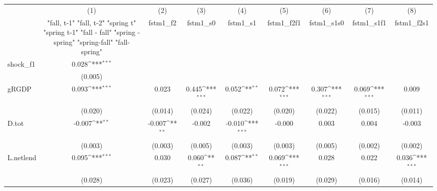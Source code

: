 {
\def\sym#1{\ifmmode^{#1}\else\(^{#1}\)\fi}
\begin{tabular}{l*{8}{c}}
\toprule
            &\multicolumn{1}{c}{(1)}&\multicolumn{1}{c}{(2)}&\multicolumn{1}{c}{(3)}&\multicolumn{1}{c}{(4)}&\multicolumn{1}{c}{(5)}&\multicolumn{1}{c}{(6)}&\multicolumn{1}{c}{(7)}&\multicolumn{1}{c}{(8)}\\
            &\multicolumn{1}{c}{  "fall, t-1" "fall, t-2" "spring t" "spring t-1"  "fall - fall" "spring - spring" "spring-fall" "fall-spring" }&\multicolumn{1}{c}{fstm1\_f2}&\multicolumn{1}{c}{fstm1\_s0}&\multicolumn{1}{c}{fstm1\_s1}&\multicolumn{1}{c}{fstm1\_f2f1}&\multicolumn{1}{c}{fstm1\_s1s0}&\multicolumn{1}{c}{fstm1\_s1f1}&\multicolumn{1}{c}{fstm1\_f2s1}\\
\midrule
shock\_f1    &       0.028\sym{***}&                     &                     &                     &                     &                     &                     &                     \\
            &     (0.005)         &                     &                     &                     &                     &                     &                     &                     \\
\addlinespace
gRGDP       &       0.093\sym{***}&       0.023         &       0.445\sym{***}&       0.052\sym{**} &       0.072\sym{***}&       0.307\sym{***}&       0.069\sym{***}&       0.009         \\
            &     (0.020)         &     (0.014)         &     (0.024)         &     (0.022)         &     (0.020)         &     (0.022)         &     (0.015)         &     (0.011)         \\
\addlinespace
D.tot       &      -0.007\sym{**} &      -0.007\sym{**} &      -0.002         &      -0.010\sym{***}&      -0.000         &       0.003         &       0.004         &      -0.003         \\
            &     (0.003)         &     (0.003)         &     (0.005)         &     (0.003)         &     (0.003)         &     (0.005)         &     (0.002)         &     (0.002)         \\
\addlinespace
L.netlend   &       0.095\sym{***}&       0.030         &       0.060\sym{**} &       0.087\sym{**} &       0.069\sym{***}&       0.028         &       0.022         &       0.036\sym{***}\\
            &     (0.028)         &     (0.023)         &     (0.027)         &     (0.036)         &     (0.019)         &     (0.029)         &     (0.016)         &     (0.014)         \\

\end{tabular}}
